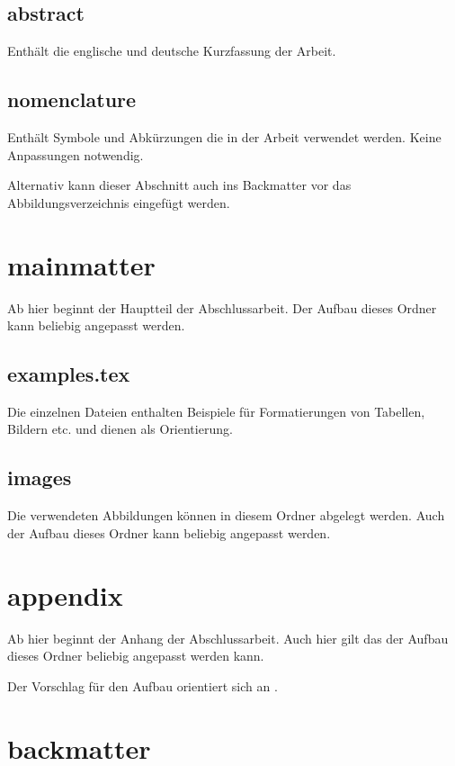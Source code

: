 \subsection*{abstract}

Enthält die englische und deutsche Kurzfassung der Arbeit.

\subsection*{nomenclature}

Enthält Symbole und Abkürzungen die in der Arbeit verwendet werden. Keine Anpassungen notwendig.

Alternativ kann dieser Abschnitt auch ins Backmatter vor das Abbildungsverzeichnis eingefügt werden.

\section*{mainmatter}
\label{section:_A_mainmatter}

Ab hier beginnt der Hauptteil der Abschlussarbeit. Der Aufbau dieses Ordner kann beliebig angepasst werden.

\subsection*{examples.tex}

Die einzelnen Dateien enthalten Beispiele für Formatierungen von Tabellen, Bildern etc. und dienen als Orientierung.

\subsection*{images}

Die verwendeten Abbildungen können in diesem Ordner abgelegt werden. Auch der Aufbau dieses Ordner kann beliebig angepasst werden.

\section*{appendix}

Ab hier beginnt der Anhang der Abschlussarbeit. Auch hier gilt das der Aufbau dieses Ordner beliebig angepasst werden kann.

Der Vorschlag für den Aufbau orientiert sich an .

\section*{backmatter}

